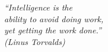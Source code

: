 \begin{epigrafe}
	\vspace*{\fill}
	\begin{flushright}
		\textit{``Intelligence is the \\
			ability to avoid doing work, \\
			yet getting the work done.''\\
			(Linus Torvalds)}
	\end{flushright}
\end{epigrafe}
